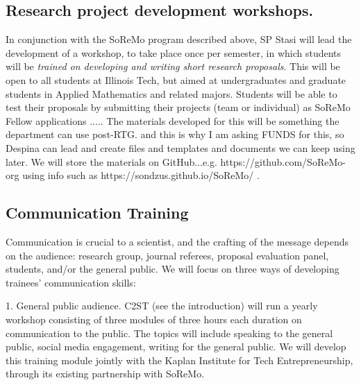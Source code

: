 \documentclass[11pt]{NSFamsart}
\begin{document}
\subsection*{Research project development workshops.} 
In conjunction with the SoReMo program described above, SP Stasi will lead the development of a workshop, to take place once per semester, in which students will be \emph{trained on developing and writing short research proposals}. This will be open to all students at Illinois Tech, but aimed at undergraduates and graduate students in Applied Mathematics  and related majors. Students will be able to test their proposals by submitting their projects (team or individual) as SoReMo Fellow applications ..... The materials developed for this will be something the department can use post-RTG. {\color{magenta}and this is why I am asking FUNDS for this, so Despina can lead and create files and templates and documents we can keep using later. } We will store the materials on GitHub...e.g. https://github.com/SoReMo-org using info such as https://sondzus.github.io/SoReMo/  . 

\subsection*{Communication Training}
Communication is crucial to a scientist, and the crafting of the message depends on the audience:  research group, journal referees, proposal evaluation panel, students, and/or the general public. We will focus on three ways of developing trainees' communication skills: 

1. General public audience.  C2ST (see the introduction) will run a yearly workshop consisting of three modules of three hours each duration on communication to the public. The topics will include speaking to the general public, social media engagement, writing for the general public.  %
We will develop this training module jointly with the Kaplan Institute for Tech Entrepreneurship, through its existing partnership with SoReMo. 
\end{document}
